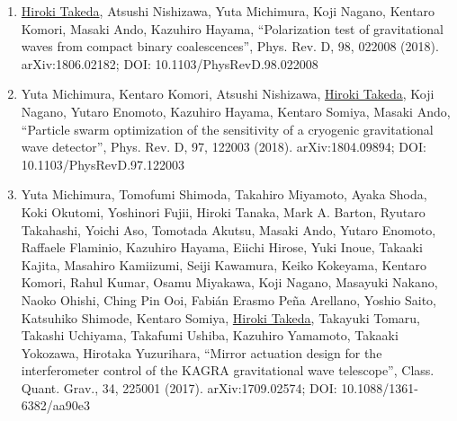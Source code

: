 \documentclass[uplatex, 11pt]{jsarticle}
\begin{document}
\begin{enumerate}
\item \uline{Hiroki Takeda}, Atsushi Nishizawa, Yuta Michimura, Koji Nagano, Kentaro Komori, Masaki Ando, Kazuhiro Hayama, “Polarization test of gravitational waves from compact binary coalescences”, Phys. Rev. D, 98, 022008 (2018). arXiv:1806.02182; DOI: 10.1103/PhysRevD.98.022008
\item Yuta Michimura, Kentaro Komori, Atsushi Nishizawa, \uline{Hiroki Takeda}, Koji Nagano, Yutaro Enomoto, Kazuhiro Hayama, Kentaro Somiya, Masaki Ando, “Particle swarm optimization of the sensitivity of a cryogenic gravitational wave detector”, Phys. Rev. D, 97, 122003 (2018). arXiv:1804.09894; DOI: 10.1103/PhysRevD.97.122003
\item Yuta Michimura, Tomofumi Shimoda, Takahiro Miyamoto, Ayaka Shoda, Koki Okutomi, Yoshinori Fujii, Hiroki Tanaka, Mark A. Barton, Ryutaro Takahashi, Yoichi Aso, Tomotada Akutsu, Masaki Ando, Yutaro Enomoto, Raffaele Flaminio, Kazuhiro Hayama, Eiichi Hirose, Yuki Inoue, Takaaki Kajita, Masahiro Kamiizumi, Seiji Kawamura, Keiko Kokeyama, Kentaro Komori, Rahul Kumar, Osamu Miyakawa, Koji Nagano, Masayuki Nakano, Naoko Ohishi, Ching Pin Ooi, Fabián Erasmo Peña Arellano, Yoshio Saito, Katsuhiko Shimode, Kentaro Somiya, \uline{Hiroki Takeda}, Takayuki Tomaru, Takashi Uchiyama, Takafumi Ushiba, Kazuhiro Yamamoto, Takaaki Yokozawa, Hirotaka Yuzurihara, “Mirror actuation design for the interferometer control of the KAGRA gravitational wave telescope”, Class. Quant. Grav., 34, 225001 (2017). arXiv:1709.02574; DOI: 10.1088/1361-6382/aa90e3
\end{enumerate}
\end{document}
